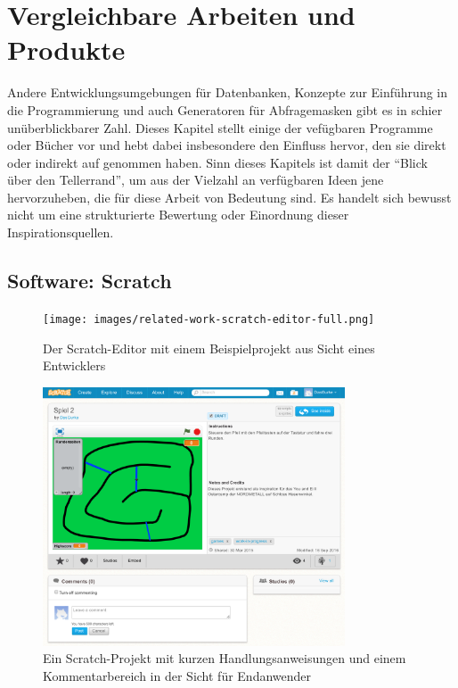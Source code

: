 \section{Vergleichbare Arbeiten und Produkte}
\label{sec:related-work}

Andere Entwicklungsumgebungen für Datenbanken, Konzepte zur Einführung in die Programmierung und auch Generatoren für Abfragemasken gibt es in schier unüberblickbarer Zahl. Dieses Kapitel stellt einige der vefügbaren Programme oder Bücher vor und hebt dabei insbesondere den Einfluss hervor, den sie direkt oder indirekt auf \idename{} genommen haben. Sinn dieses Kapitels ist damit der "`Blick über den Tellerrand"', um aus der Vielzahl an verfügbaren Ideen jene hervorzuheben, die für diese Arbeit von Bedeutung sind. Es handelt sich bewusst nicht um eine strukturierte Bewertung oder Einordnung dieser Inspirationsquellen.

\subsection{Software: Scratch}

\begin{figure}[p]
  \centering \texttt{[image: images/related-work-scratch-editor-full.png]}
  \caption{Der Scratch-Editor mit einem Beispielprojekt aus Sicht eines Entwicklers}
  \label{fig:scratch-editor-full}
\end{figure}

\begin{figure}[p]
  \centering \includegraphics[width=0.8\textwidth]{images/related-work-scratch-project-full.png}
  \caption{Ein Scratch-Projekt mit kurzen Handlungsanweisungen und einem Kommentarbereich in der Sicht für Endanwender}
  \label{fig:scratch-enduser-full}
\end{figure}

